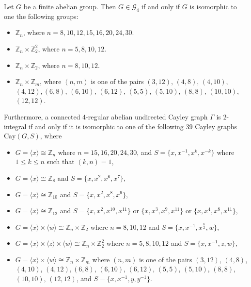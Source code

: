 \documentclass[10pt,a4paper]{amsart}
\def \leq {\leqslant}
\begin{document}
	\begin{thm}\label{4}
		Let $G$ be a finite abelian group. Then $G\in\mathcal{G}_4$ if and only if $G$ is isomorphic to one the following groups:
		\begin{itemize}
			\item[$(1)$] $\mathbb Z_n$, where $n=8,10,12,15,16,20,24,30$.
			\item[$(2)$] $\mathbb Z_n\times\mathbb Z_2^2$, where $n=5,8,10,12$.
			\item[$(3)$] $\mathbb Z_n\times\mathbb Z_2$, where $n=8,10,12$.
			\item[$(4)$] $\mathbb Z_n\times\mathbb Z_m$, where $(n,m)$ is one of the pairs $(3,12)$, $(4,8)$, $(4,10)$, $(4,12), (6,8)$, $(6,10)$, $(6,12)$, $(5,5)$, $(5,10)$, $(8,8)$, $(10,10)$, $(12,12)$.
		\end{itemize}
		Furthermore, a connected $4$-regular abelian undirected Cayley graph $\Gamma$ is $2$-integral if and only if it is isomorphic to one of the  following $39$ Cayley graphs $\mathrm{Cay}(G,S)$, where
		\begin{itemize}
			\item[$\romannumeral1$.] $G=\langle x\rangle \cong \mathbb{Z}_n$ where $n=15,16,20,24,30$, and $S=\{x,x^{-1},x^k,x^{-k}\}$ where $1\leq k\leq n$ such that $(k,n)=1$,
			\item[$\romannumeral2$.] $G=\langle x\rangle \cong \mathbb{Z}_8$ and $S=\{x,x^2,x^6,x^7\}$,		
			\item[$\romannumeral3$.] $G=\langle x\rangle \cong \mathbb{Z}_{10}$ and $S=\{x,x^2,x^8,x^9\}$,
			\item[$\romannumeral4$.] $G=\langle x\rangle \cong \mathbb{Z}_{12}$ and $S=\{x,x^2,x^{10},x^{11}\}$ or $\{x,x^3,x^9,x^{11}\}$ or $\{x,x^4,x^8,x^{11}\}$,
			\item[$\romannumeral5$.] $G=\langle x\rangle\times \langle w\rangle\cong \mathbb{Z}_n\times \mathbb{Z}_2$ where $n=8,10,12$ and $S=\{x,x^{-1},x^{\frac{n}{2}},w\}$,
			\item[$\romannumeral6$.] $G=\langle x\rangle\times \langle z\rangle\times \langle w\rangle\cong \mathbb{Z}_n\times \mathbb{Z}_2^2$ where $n=5,8,10,12$ and $S=\{x,x^{-1},z,w\}$,
			\item[$\romannumeral7$.] $G=\langle x\rangle\times \langle w\rangle\cong \mathbb{Z}_n\times \mathbb{Z}_m$ where $(n,m)$ is one of the pairs $(3,12)$, $(4,8)$, $(4,10)$, $(4,12), (6,8)$, $(6,10)$, $(6,12)$, $(5,5)$, $(5,10)$, $(8,8)$, $(10,10)$, $(12,12)$, and $S=\{x,x^{-1},y,y^{-1}\}$.
		\end{itemize}
	\end{thm}
\end{document}
